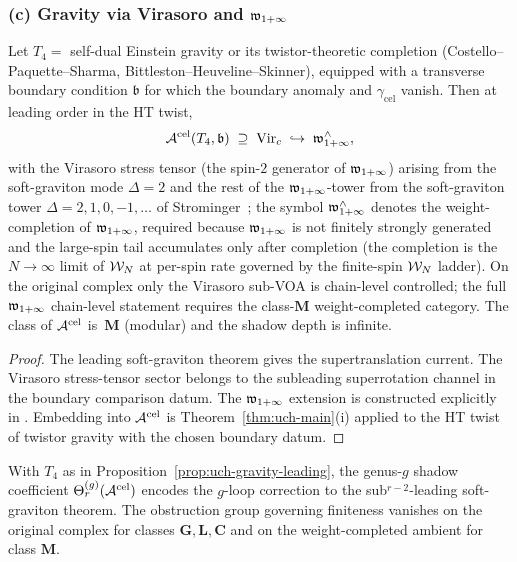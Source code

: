\subsubsection*{(c) Gravity via Virasoro and $\mathfrak w_{1+\infty}$}

\begin{proposition}
\label{prop:uch-gravity-leading}
Let $T_4 = $ self-dual Einstein gravity or its twistor-theoretic
completion (Costello--Paquette--Sharma, Bittleston--Heuveline--Skinner),
equipped with a transverse boundary condition $\mathfrak b$ for which
the boundary anomaly and $\gamma_{\mathrm{cel}}$ vanish. Then at
leading order in the HT twist,
\[
\mathcal A^{\mathrm{cel}}(T_4,\mathfrak b) \;\supseteq\; \mathrm{Vir}_c
\;\hookrightarrow\; \mathfrak w_{1+\infty}^{\wedge},
\]
with the Virasoro stress tensor (the spin-$2$ generator of $\mathfrak w_{1+\infty}$)
arising from the soft-graviton mode $\Delta = 2$ and the rest of the
$\mathfrak w_{1+\infty}$-tower from the soft-graviton tower
$\Delta = 2, 1, 0, -1, \dots$ of
Strominger~\cite{StromingerWInfinityCelestial}; the symbol
$\mathfrak w_{1+\infty}^{\wedge}$ denotes the weight-completion of $\mathfrak w_{1+\infty}$, required
because $\mathfrak w_{1+\infty}$ is not finitely strongly generated and the
large-spin tail accumulates only after completion
(the completion is the $N \to \infty$ limit of $\mathcal W_N$ at per-spin
rate governed by the finite-spin $\mathcal W_N$ ladder). On the original
complex only the Virasoro sub-VOA is chain-level controlled; the full
$\mathfrak w_{1+\infty}$ chain-level statement requires the class-$\mathbf M$ weight-completed
category. The class of $\mathcal A^{\mathrm{cel}}$ is~$\mathbf M$ (modular) and
the shadow depth is infinite.
\end{proposition}

\begin{proof}
The leading soft-graviton theorem gives the supertranslation current.
The Virasoro stress-tensor sector belongs to the subleading
superrotation channel in the boundary comparison datum. The $\mathfrak w_{1+\infty}$
extension is constructed explicitly in
\cite{StromingerWInfinityCelestial,
GuevaraHimwichPateStrominger21,
AdamoMasonSharmaCelestial,
BittlestonHeuvelineSkinner}. Embedding into $\mathcal A^{\mathrm{cel}}$ is
Theorem~\ref{thm:uch-main}(i) applied to the HT twist of twistor
gravity with the chosen boundary datum.
\end{proof}

\begin{proposition}
\label{prop:uch-gravity-higher-partial}
With $T_4$ as in Proposition~\ref{prop:uch-gravity-leading},
the genus-$g$ shadow coefficient
$\Theta_r^{(g)}(\mathcal A^{\mathrm{cel}})$ encodes the $g$-loop correction
to the sub${}^{r-2}$-leading soft-graviton theorem. The obstruction
group governing finiteness vanishes on the original complex for
classes $\mathbf G, \mathbf L, \mathbf C$ and on the
weight-completed ambient for class $\mathbf M$.
\end{proposition}

